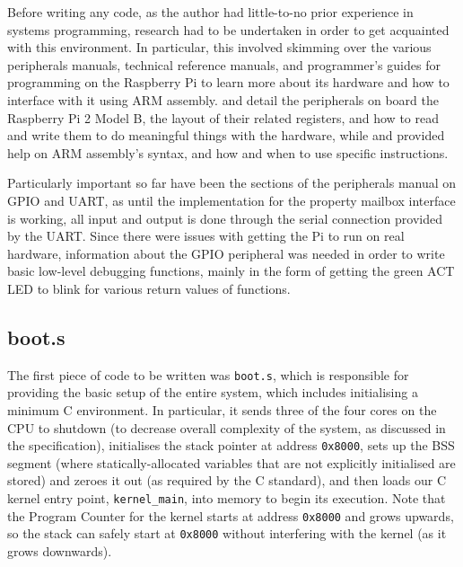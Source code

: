 \documentclass[10pt,a4paper]{article}
\newcommand{\code}[1]{\texttt{#1}}
\begin{document}
Before writing any code, as the author had little-to-no prior experience in
systems programming, research had to be undertaken in order to get acquainted
with this environment. In particular, this involved skimming over the various
peripherals manuals, technical reference manuals, and programmer's guides for
programming on the Raspberry Pi to learn more about its hardware and how to
interface with it using ARM assembly. \cite{BCM2835} and \cite{BCM2836} detail the
peripherals on board the Raspberry Pi 2 Model B, the layout of their related
registers, and how to read and write them to do meaningful things with the
hardware, while \cite{TRM} and \cite{PG} provided help on ARM assembly's syntax,
and how and when to use specific instructions.

Particularly important so far have been the sections of the peripherals manual
on GPIO and UART, as until the implementation for the property mailbox interface
is working, all input and output is done through the serial connection provided
by the UART.  Since there were issues with getting the Pi to run on real
hardware, information about the GPIO peripheral was needed in order to write
basic low-level debugging functions, mainly in the form of getting the green ACT
LED to blink for various return values of functions.

\subsection{boot.s}
The first piece of code to be written was \code{boot.s}, which is responsible
for providing the basic setup of the entire system, which includes initialising
a minimum C environment. In particular, it sends three of the four cores on the
CPU to shutdown (to decrease overall complexity of the system, as discussed in
the specification), initialises the stack pointer at address \code{0x8000}, sets
up the BSS segment (where statically-allocated variables that are not explicitly
initialised are stored) and zeroes it out (as required by the C standard), and
then loads our C kernel entry point, \code{kernel\_main}, into memory to begin
its execution. Note that the Program Counter for the kernel starts at address
\code{0x8000} and grows upwards, so the stack can safely start at \code{0x8000}
without interfering with the kernel (as it grows downwards).
\end{document}
